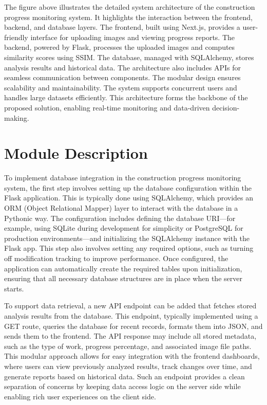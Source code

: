 The figure above illustrates the detailed system architecture of the construction progress monitoring system. It highlights the interaction between the frontend, backend, and database layers. The frontend, built using Next.js, provides a user-friendly interface for uploading images and viewing progress reports. The backend, powered by Flask, processes the uploaded images and computes similarity scores using SSIM. The database, managed with SQLAlchemy, stores analysis results and historical data. The architecture also includes APIs for seamless communication between components. The modular design ensures scalability and maintainability. The system supports concurrent users and handles large datasets efficiently. This architecture forms the backbone of the proposed solution, enabling real-time monitoring and data-driven decision-making.


\section{Module Description}
To implement database integration in the construction progress monitoring system, the first step involves setting up the database configuration within the Flask application. This is typically done using SQLAlchemy, which provides an ORM (Object Relational Mapper) layer to interact with the database in a Pythonic way. The configuration includes defining the database URI—for example, using SQLite during development for simplicity or PostgreSQL for production environments—and initializing the SQLAlchemy instance with the Flask app. This step also involves setting any required options, such as turning off modification tracking to improve performance. Once configured, the application can automatically create the required tables upon initialization, ensuring that all necessary database structures are in place when the server starts.

To support data retrieval, a new API endpoint can be added that fetches stored analysis results from the database. This endpoint, typically implemented using a GET route, queries the database for recent records, formats them into JSON, and sends them to the frontend. The API response may include all stored metadata, such as the type of work, progress percentage, and associated image file paths. This modular approach allows for easy integration with the frontend dashboards, where users can view previously analyzed results, track changes over time, and generate reports based on historical data. Such an endpoint provides a clean separation of concerns by keeping data access logic on the server side while enabling rich user experiences on the client side.

